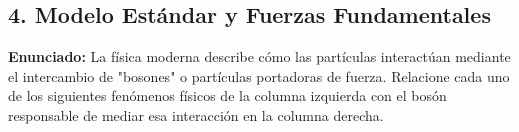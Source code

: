 \documentclass[12pt, letterpaper]{article}
\begin{document}
\subsection*{4. Modelo Estándar y Fuerzas Fundamentales}
\noindent \textbf{Enunciado:} La física moderna describe cómo las partículas interactúan mediante el intercambio de "bosones" o partículas portadoras de fuerza. Relacione cada uno de los siguientes fenómenos físicos de la columna izquierda con el bosón responsable de mediar esa interacción en la columna derecha.

\end{document}
